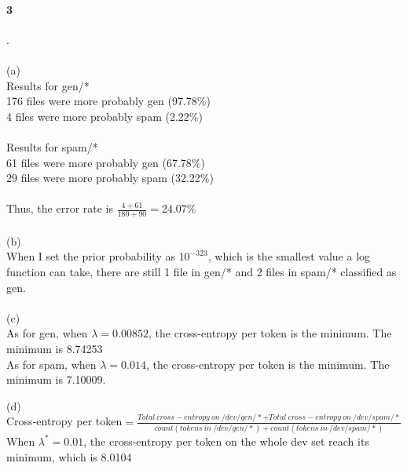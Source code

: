 \documentclass[11pt]{article}
\begin{document}
\paragraph{3}. \\
\\
(a)\\
Results for gen/*\\
176 files were more probably gen (97.78\%)\\
4 files were more probably spam (2.22\%)\\
\\
Results for spam/*\\
61 files were more probably gen (67.78\%)\\
29 files were more probably spam (32.22\%)\\
\\
Thus, the error rate is $\frac{4+61}{180+90}=24.07\%$\\
\\
(b)\\
When I set the prior probability as $10^{-323}$, which is the smallest value a log function can take, there are still 1 file in gen/* and 2 files in spam/* classified as gen.\\
\\

(c)\\
As for gen, when $\lambda=0.00852$, the cross-entropy per token is the minimum. The minimum is 8.74253\\
As for spam, when $\lambda=0.014$, the cross-entropy per token is the minimum. The minimum is 7.10009.

(d)\\
Cross-entropy per token$=\frac{Total~cross-entropy~on~/dev/gen/*+Total~cross-entropy~on~/dev/spam/*}{count(tokens~in~/dev/gen/*)+count(tokens~in~/dev/spam/*)}$\\
When $\lambda^*=0.01$, the cross-entropy per token on the whole dev set reach its minimum, which is 8.0104\\
\\
\end{document}
